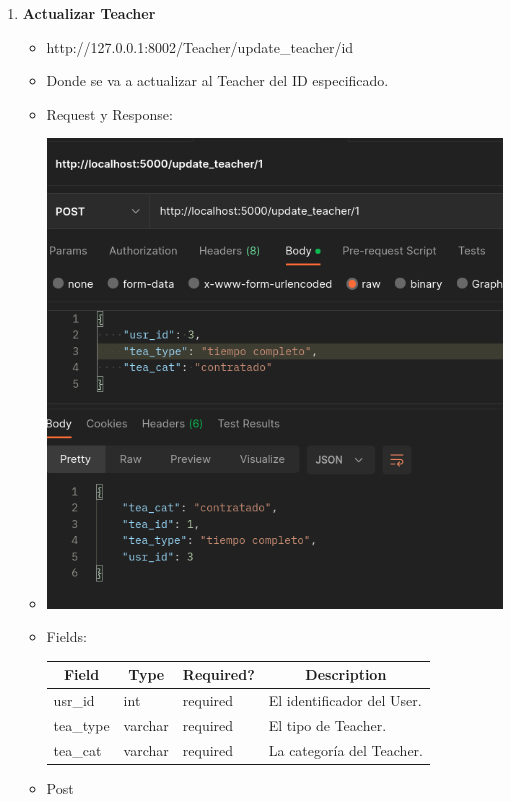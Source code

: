 \documentclass{article}
\begin{document}
\begin{enumerate}
    \item \textbf{Actualizar Teacher}
    \begin{itemize}
        \item http://127.0.0.1:8002/Teacher/update\_teacher/id
        \item Donde se va a actualizar al Teacher del ID especificado.
        \item Request y Response:
        \item \includegraphics[scale=.5]{assets/teacher/update.png}
        \item Fields: \begin{table}[H] \centering \begin{tabular}{|l|l|l|l|} \hline
        \multicolumn{1}{|c|}{\textbf{Field}} &
        \multicolumn{1}{c|}{\textbf{Type}} &
        \multicolumn{1}{c|}{\textbf{Required?}} &
        \multicolumn{1}{c|}{\textbf{Description}} \\ \hline usr\_id & int &
        required & El identificador del User. \\ \hline tea\_type & varchar &
        required & El tipo de Teacher. \\ \hline tea\_cat & varchar & required &
        La categoría del Teacher. \\ \hline \end{tabular} \end{table} \item Post

\end{itemize}
\end{enumerate}
\end{document}

